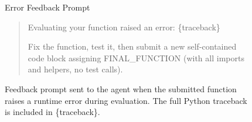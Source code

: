 \begin{figure}[h]
    \begin{AIbox}{Error Feedback Prompt}

\begin{quote}
\ttfamily
\tiny
\vspace{2mm}

Evaluating your function raised an error:
\{traceback\}

Fix the function, test it, then submit a new self-contained code block
assigning FINAL\_FUNCTION (with all imports and helpers, no test calls).

\end{quote}

\end{AIbox}
    \caption{Feedback prompt sent to the agent when the submitted function raises a runtime error during evaluation. The full Python traceback is included in \{traceback\}.}
    \label{prompts:error_feedback}

\end{figure}
